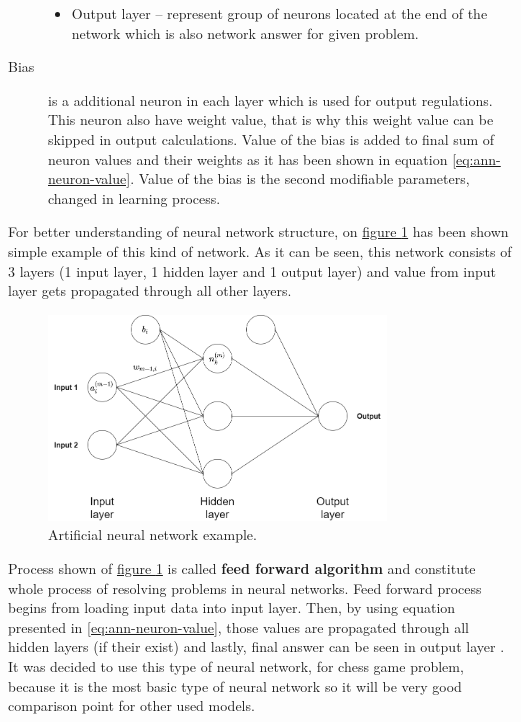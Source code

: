 \begin{description}
\begin{itemize}
            \item Output layer -- represent group of neurons located at the end of the network which is also network answer for given problem.
        \end{itemize}
        \item[Bias] is a additional neuron in each layer which is used for output regulations. This neuron also have weight value, that is why this weight value can be skipped in output calculations. Value of the bias is added to final sum of neuron values and their weights as it has been shown in equation \ref{eq:ann-neuron-value}. Value of the bias is the second modifiable parameters, changed in learning process.
    \end{description}
    For better understanding of neural network structure, on \hyperref[fig:ann-example]{figure \ref*{fig:ann-example}} has been shown simple example of this kind of network. As it can be seen, this network consists of 3 layers (1 input layer, 1 hidden layer and 1 output layer) and value from input layer gets propagated through all other layers.
    \begin{figure}
        \centering
        \includegraphics[width=0.8\textwidth]{dependencies/pictures/NN_example.png}
        \caption{Artificial neural network example.}
        \label{fig:ann-example}
    \end{figure}
    Process shown of \hyperref[fig:ann-example]{figure \ref*{fig:ann-example}} is called \textbf{feed forward algorithm} and constitute whole process of resolving problems in neural networks. Feed forward process begins from loading input data into input layer. Then, by using equation presented in \ref{eq:ann-neuron-value}, those values are propagated through all hidden layers (if their exist) and lastly, final answer can be seen in output layer \cite{bib:book-make-own-neural-network,bib:article-application-of-feedforward-for-grade-estimation,bib:internet-neural-network-and-deep-learning}. It was decided to use this type of neural network, for chess game problem, because it is the most basic type of neural network so it will be very good comparison point for other used models.

